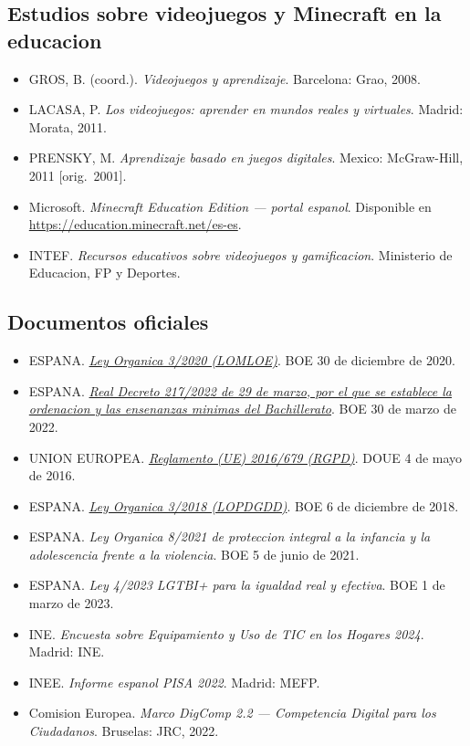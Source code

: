 \documentclass[12pt,a4paper]{scrartcl}
\begin{document}
\subsection{Estudios sobre videojuegos y Minecraft en la educacion}
\begin{itemize}[leftmargin=1.3em,itemsep=0.15em,topsep=0.3em]
  \item GROS, B. (coord.). \emph{Videojuegos y aprendizaje}. Barcelona: Grao, 2008.
  \item LACASA, P. \emph{Los videojuegos: aprender en mundos reales y virtuales}. Madrid: Morata, 2011.
  \item PRENSKY, M. \emph{Aprendizaje basado en juegos digitales}. Mexico: McGraw-Hill, 2011 [orig.~2001].
  \item Microsoft. \emph{Minecraft Education Edition --- portal espanol}. Disponible en \url{https://education.minecraft.net/es-es}.
  \item INTEF. \emph{Recursos educativos sobre videojuegos y gamificacion}. Ministerio de Educacion, FP y Deportes.
\end{itemize}

\subsection{Documentos oficiales}
\begin{itemize}[leftmargin=1.3em,itemsep=0.15em,topsep=0.3em]
  \item ESPANA. \href{https://www.boe.es/buscar/act.php?id=BOE-A-2020-17264}{\emph{Ley Organica 3/2020 (LOMLOE)}}. BOE 30 de diciembre de 2020.
  \item ESPANA. \href{https://www.boe.es/buscar/act.php?id=BOE-A-2022-4975}{\emph{Real Decreto 217/2022 de 29 de marzo, por el que se establece la ordenacion y las ensenanzas minimas del Bachillerato}}. BOE 30 de marzo de 2022.
  \item UNION EUROPEA. \href{https://eur-lex.europa.eu/eli/reg/2016/679/oj}{\emph{Reglamento (UE) 2016/679 (RGPD)}}. DOUE 4 de mayo de 2016.
  \item ESPANA. \href{https://www.boe.es/buscar/act.php?id=BOE-A-2018-16673}{\emph{Ley Organica 3/2018 (LOPDGDD)}}. BOE 6 de diciembre de 2018.
  \item ESPANA. \emph{Ley Organica 8/2021 de proteccion integral a la infancia y la adolescencia frente a la violencia}. BOE 5 de junio de 2021.
  \item ESPANA. \emph{Ley 4/2023 LGTBI+ para la igualdad real y efectiva}. BOE 1 de marzo de 2023.
  \item INE. \emph{Encuesta sobre Equipamiento y Uso de TIC en los Hogares 2024}. Madrid: INE.
  \item INEE. \emph{Informe espanol PISA 2022}. Madrid: MEFP.
  \item Comision Europea. \emph{Marco DigComp 2.2 --- Competencia Digital para los Ciudadanos}. Bruselas: JRC, 2022.
\end{itemize}
\end{document}
